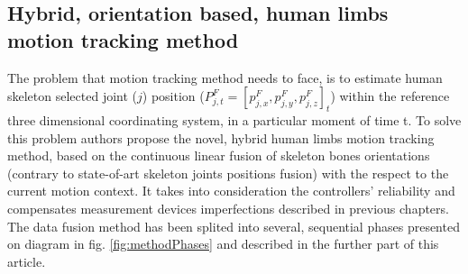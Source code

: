 \documentclass[sensors,article,submit,moreauthors,pdftex,10pt,a4paper]{mdpi}
\begin{document}
\subsection{Hybrid, orientation based, human limbs motion tracking method}
	The problem that motion tracking method needs to face, is to estimate human skeleton selected joint ($j$) position ($P^F_{j,t} = [p^F_{j,x}, p^F_{j,y}, p^F_{j,z}]_t$) within the reference three dimensional coordinating system, in a particular moment of time t. To solve this problem authors propose the novel, hybrid human limbs motion tracking method, based on the continuous linear fusion of skeleton bones orientations (contrary to state-of-art skeleton joints positions fusion) with the respect to the current motion context. It takes into consideration the controllers’ reliability and compensates measurement devices imperfections described in previous chapters. The data fusion method has been splited into several, sequential phases presented on diagram in fig. \ref{fig:methodPhases} and described in the further part of this article. 
	
\end{document}
